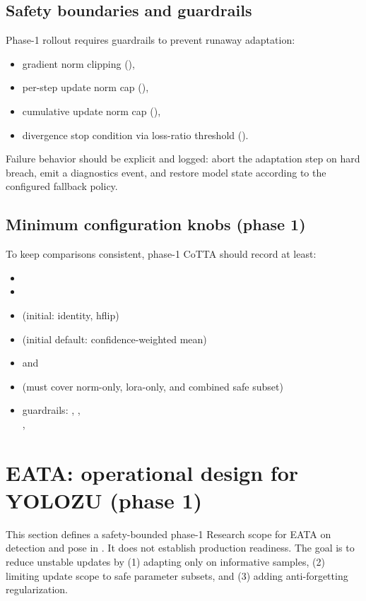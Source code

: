 \subsection{Safety boundaries and guardrails}
Phase-1 rollout requires guardrails to prevent runaway adaptation:
\begin{itemize}
  \item gradient norm clipping (),
  \item per-step update norm cap (),
  \item cumulative update norm cap (),
  \item divergence stop condition via loss-ratio threshold ().
\end{itemize}

Failure behavior should be explicit and logged:
abort the adaptation step on hard breach, emit a diagnostics event, and restore model state according to the configured fallback policy.

\subsection{Minimum configuration knobs (phase 1)}
To keep comparisons consistent, phase-1 CoTTA should record at least:
\begin{itemize}
  \item {}
  \item {}
  \item {} (initial: identity, hflip)
  \item {} (initial default: confidence-weighted mean)
  \item {} and 
  \item {} (must cover norm-only, lora-only, and combined safe subset)
  \item guardrails: , , \\
    , 
\end{itemize}

\section{EATA: operational design for YOLOZU (phase 1)}
This section defines a safety-bounded phase-1 Research scope for EATA on detection
and pose in \yolozu{}. It does not establish production readiness.
The goal is to reduce unstable updates by (1) adapting only on informative samples,
(2) limiting update scope to safe parameter subsets, and (3) adding anti-forgetting regularization.

